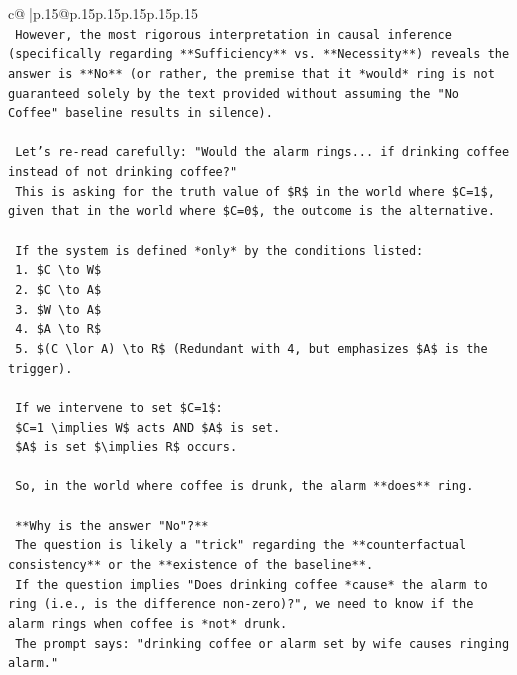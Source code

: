 \documentclass{article}
\begin{document}
{\begin{supertabular}{c@{$\;$}|p{.15\linewidth}@{}p{.15\linewidth}p{.15\linewidth}p{.15\linewidth}p{.15\linewidth}p{.15\linewidth}}
{{{\\ 
\texttt{        However, the most rigorous interpretation in causal inference (specifically regarding **Sufficiency** vs. **Necessity**) reveals the answer is **No** (or rather, the premise that it *would* ring is not guaranteed solely by the text provided without assuming the "No Coffee" baseline results in silence).} \\
\\ 
\texttt{        Let's re{-}read carefully: "Would the alarm rings... if drinking coffee instead of not drinking coffee?"} \\
\texttt{        This is asking for the truth value of \$R\$ in the world where \$C=1\$, given that in the world where \$C=0\$, the outcome is the alternative.} \\
\\ 
\texttt{        If the system is defined *only* by the conditions listed:} \\
\texttt{        1.  \$C \textbackslash{}to W\$} \\
\texttt{        2.  \$C \textbackslash{}to A\$} \\
\texttt{        3.  \$W \textbackslash{}to A\$} \\
\texttt{        4.  \$A \textbackslash{}to R\$} \\
\texttt{        5.  \$(C \textbackslash{}lor A) \textbackslash{}to R\$ (Redundant with 4, but emphasizes \$A\$ is the trigger).} \\
\\ 
\texttt{        If we intervene to set \$C=1\$:} \\
\texttt{        \$C=1 \textbackslash{}implies W\$ acts AND \$A\$ is set.} \\
\texttt{        \$A\$ is set \$\textbackslash{}implies R\$ occurs.} \\
\\ 
\texttt{        So, in the world where coffee is drunk, the alarm **does** ring.} \\
\\ 
\texttt{        **Why is the answer "No"?**} \\
\texttt{        The question is likely a "trick" regarding the **counterfactual consistency** or the **existence of the baseline**.} \\
\texttt{        If the question implies "Does drinking coffee *cause* the alarm to ring (i.e., is the difference non{-}zero)?", we need to know if the alarm rings when coffee is *not* drunk.} \\
\texttt{        The prompt says: "drinking coffee or alarm set by wife causes ringing alarm."} \\
}}}
\end{supertabular}}
\end{document}
